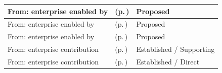 \begin{longtable}{|>{\raggedright\arraybackslash}p{0.27\TableWidth}|>{\raggedright\arraybackslash}p{0.48\TableWidth}|>{\raggedright\arraybackslash}p{0.25\TableWidth}|}
From: enterprise enabled by & \nameref{cap:bec-information-design-governance} (p.\,\pageref{cap:bec-information-design-governance}) & Proposed\\\hline
From: enterprise enabled by & \nameref{cap:bec-clinical-knowledge-services} (p.\,\pageref{cap:bec-clinical-knowledge-services}) & Proposed\\\hline
From: enterprise enabled by & \nameref{cap:bec-governed-reference-dataset-administration} (p.\,\pageref{cap:bec-governed-reference-dataset-administration}) & Proposed\\\hline
From: enterprise contribution & \nameref{cap:bec-assurance-design} (p.\,\pageref{cap:bec-assurance-design}) & Established / Supporting\\\hline
From: enterprise contribution & \nameref{cap:bec-assurance-criteria-management} (p.\,\pageref{cap:bec-assurance-criteria-management}) & Established / Direct\\\hline
\end{longtable}\endgroup

